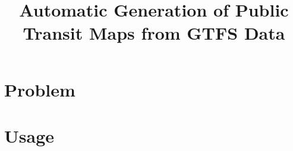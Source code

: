 \documentclass{sig-alternate-sigmod09}
\begin{document}
\title{Automatic Generation of Public Transit Maps from GTFS Data}

\maketitle


\section{Problem}
\section{Usage}



\balancecolumns 
\end{document}
